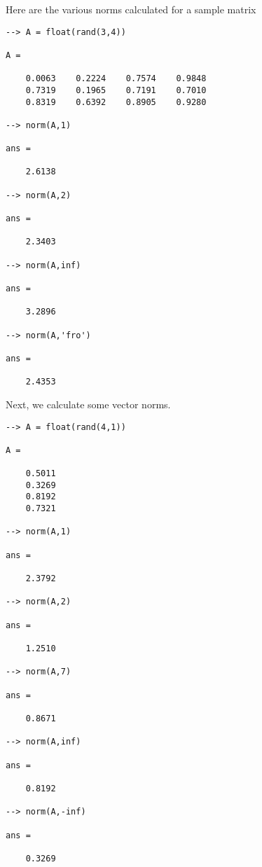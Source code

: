 Here are the various norms calculated for a sample matrix
\begin{verbatim}
--> A = float(rand(3,4))

A = 

    0.0063    0.2224    0.7574    0.9848 
    0.7319    0.1965    0.7191    0.7010 
    0.8319    0.6392    0.8905    0.9280 

--> norm(A,1)

ans = 

    2.6138 

--> norm(A,2)

ans = 

    2.3403 

--> norm(A,inf)

ans = 

    3.2896 

--> norm(A,'fro')

ans = 

    2.4353 
\end{verbatim}
Next, we calculate some vector norms.
\begin{verbatim}
--> A = float(rand(4,1))

A = 

    0.5011 
    0.3269 
    0.8192 
    0.7321 

--> norm(A,1)

ans = 

    2.3792 

--> norm(A,2)

ans = 

    1.2510 

--> norm(A,7)

ans = 

    0.8671 

--> norm(A,inf)

ans = 

    0.8192 

--> norm(A,-inf)

ans = 

    0.3269 
\end{verbatim}
